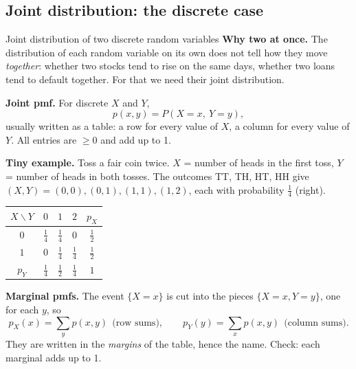 
\subsection*{Joint distribution: the discrete case}

\begin{key}{Joint distribution of two discrete random variables}
	\setlength{\parskip}{5pt}
	\textbf{Why two at once.} The distribution of each random variable on
	its own does not tell how they move \emph{together}: whether two stocks
	tend to rise on the same days, whether two loans tend to default
	together. For that we need their joint distribution.

	\begin{minipage}[t]{.55\linewidth}
		\textbf{Joint pmf.} For discrete $X$ and $Y$,
		\[ p(x,y)=P(X=x,\ Y=y), \]
		usually written as a table: a row for every value of $X$, a column for
		every value of $Y$. All entries are $\ge0$ and add up to 1.

		\textbf{Tiny example.} Toss a fair coin twice. $X$ = number of heads
		in the first toss, $Y$ = number of heads in both tosses. The outcomes
		TT, TH, HT, HH give $(X,Y)=(0,0),(0,1),(1,1),(1,2)$, each with
		probability $\frac14$ (right).
	\end{minipage}\hfill
	\begin{minipage}[t]{.41\linewidth}
		\centering\vspace{6mm}
		\renewcommand{\arraystretch}{1.8}\setlength{\tabcolsep}{7pt}
		\begin{tabular}{c|ccc|c}
			$X\backslash Y$ & $0$       & $1$       & $2$       & $p_X$     \\\hline
			$0$             & $\frac14$ & $\frac14$ & $0$       & $\frac12$ \\
			$1$             & $0$       & $\frac14$ & $\frac14$ & $\frac12$ \\\hline
			$p_Y$           & $\frac14$ & $\frac12$ & $\frac14$ & $1$
		\end{tabular}
	\end{minipage}

	\textbf{Marginal pmfs.} The event $\{X=x\}$ is cut into the pieces
	$\{X=x,Y=y\}$, one for each $y$, so
	\[ p_X(x)=\sum_y p(x,y)\ \ \text{(row sums)},\qquad
		p_Y(y)=\sum_x p(x,y)\ \ \text{(column sums)}. \]
	They are written in the \emph{margins} of the table, hence the name.
	Check: each marginal adds up to 1.


\end{key}
